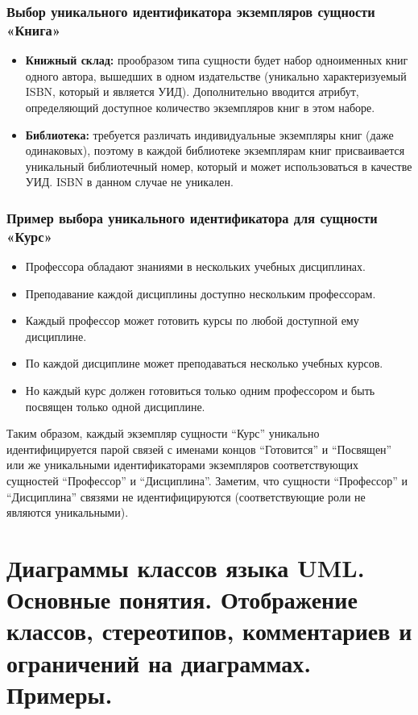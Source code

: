 \documentclass[a4paper,12pt]{article}
\begin{document}
\subsubsection{Выбор уникального идентификатора экземпляров сущности «Книга»}

\begin{itemize}
    \item \textbf{Книжный склад:} прообразом типа сущности будет набор одноименных книг одного автора, вышедших в одном издательстве (уникально характеризуемый ISBN, который и является УИД). Дополнительно вводится атрибут, определяющий доступное количество экземпляров книг в этом наборе.
    
    \item \textbf{Библиотека:} требуется различать индивидуальные экземпляры книг (даже одинаковых), поэтому в каждой библиотеке экземплярам книг присваивается уникальный библиотечный номер, который и может использоваться в качестве УИД. ISBN в данном случае не уникален.
\end{itemize}

\subsubsection{Пример выбора уникального идентификатора для сущности «Курс»}

\begin{itemize}
    \item Профессора обладают знаниями в нескольких учебных дисциплинах.
    \item Преподавание каждой дисциплины доступно нескольким профессорам.
    \item Каждый профессор может готовить курсы по любой доступной ему дисциплине.
    \item По каждой дисциплине может преподаваться несколько учебных курсов.
    \item Но каждый курс должен готовиться только одним профессором и быть посвящен только одной дисциплине.
\end{itemize}

Таким образом, каждый экземпляр сущности ``Курс'' уникально идентифицируется парой связей с именами концов ``Готовится'' и ``Посвящен'' или же уникальными идентификаторами экземпляров соответствующих сущностей ``Профессор'' и ``Дисциплина''. Заметим, что сущности ``Профессор'' и ``Дисциплина'' связями не идентифицируются (соответствующие роли не являются уникальными).

\section{Диаграммы классов языка UML. Основные понятия. Отображение классов, стереотипов, комментариев и ограничений на диаграммах. Примеры.}
\end{document}
